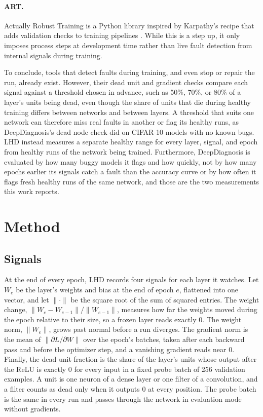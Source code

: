 \documentclass[11pt]{article}
\begin{document}
\paragraph{ART.} Actually Robust Training is a Python library inspired by Karpathy's recipe that adds validation checks to training pipelines \citep{chwilczynski2024}. While this is a step up, it only imposes process steps at development time rather than live fault detection from internal signals during training.

\medskip

To conclude, tools that detect faults during training, and even stop or repair the run, already exist. However, their dead unit and gradient checks compare each signal against a threshold chosen in advance, such as 50\%, 70\%, or 80\% of a layer's units being dead, even though the share of units that die during healthy training differs between networks and between layers. A threshold that suits one network can therefore miss real faults in another or flag its healthy runs, as DeepDiagnosis's dead node check did on CIFAR-10 models with no known bugs. LHD instead measures a separate healthy range for every layer, signal, and epoch from healthy runs of the network being trained. Furthermore, DeepDiagnosis is evaluated by how many buggy models it flags and how quickly, not by how many epochs earlier its signals catch a fault than the accuracy curve or by how often it flags fresh healthy runs of the same network, and those are the two measurements this work reports.


\section{Method}

\subsection{Signals}

At the end of every epoch, LHD records four signals for each layer it watches. Let $W_e$ be the layer's weights and bias at the end of epoch $e$, flattened into one vector, and let $\lVert \cdot \rVert$ be the square root of the sum of squared entries. The weight change, $\lVert W_e - W_{e-1} \rVert / \lVert W_{e-1} \rVert$, measures how far the weights moved during the epoch relative to their size, so a frozen layer reads exactly 0. The weight norm, $\lVert W_e \rVert$, grows past normal before a run diverges. The gradient norm is the mean of $\lVert \partial L / \partial W \rVert$ over the epoch's batches, taken after each backward pass and before the optimizer step, and a vanishing gradient reads near 0. Finally, the dead unit fraction is the share of the layer's units whose output after the ReLU is exactly 0 for every input in a fixed probe batch of 256 validation examples. A unit is one neuron of a dense layer or one filter of a convolution, and a filter counts as dead only when it outputs 0 at every position. The probe batch is the same in every run and passes through the network in evaluation mode without gradients.
\end{document}
